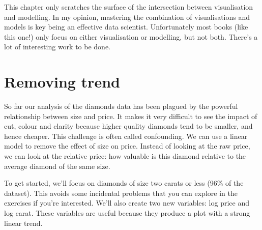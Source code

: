 This chapter only scratches the surface of the intersection between
visualisation and modelling. In my opinion, mastering the combination of
visualisations and models is key being an effective data scientist.
Unfortunately most books (like this one!) only focus on either
visualisation or modelling, but not both. There's a lot of interesting
work to be done.

\section{Removing trend}\label{sub:trend}

So far our analysis of the diamonds data has been plagued by the
powerful relationship between size and price. It makes it very difficult
to see the impact of cut, colour and clarity because higher quality
diamonds tend to be smaller, and hence cheaper. This challenge is often
called confounding. We can use a linear model to remove the effect of
size on price. Instead of looking at the raw price, we can look at the
relative price: how valuable is this diamond relative to the average
diamond of the same size. 

To get started, we'll focus on diamonds of size two carats or less (96\%
of the dataset). This avoids some incidental problems that you can
explore in the exercises if you're interested. We'll also create two new
variables: log price and log carat. These variables are useful because
they produce a plot with a strong linear trend.

